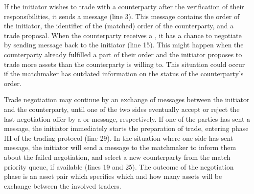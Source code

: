 If the initiator wishes to trade with a counterparty after the verification of their responsibilities, it sends a \MsgTrdProp{} message (line 3).
This message contains the order of the initiator, the identifier of the (matched) order of the counterparty, and a trade proposal.
When the counterparty receives a \MsgTrdProp{}, it has a chance to negotiate by sending \MsgTrdNegotiate{} message back to the initiator (line 15).
This might happen when the counterparty already fulfilled a part of their order and the initiator proposes to trade more assets than the counterparty is willing to.
This situation could occur if the matchmaker has outdated information on the status of the counterparty's order.

Trade negotiation may continue by an exchange of \MsgTrdNegotiate{} messages between the initiator and the counterparty, until one of the two sides eventually accept or reject the last negotiation offer by a \MsgTrdAccept{} or \MsgTrdReject{} message, respectively.
If one of the parties has sent a \MsgTrdAccept{} message, the initiator immediately starts the preparation of trade, entering phase III of the trading protocol (line 29). 
In the situation where one side has sent \MsgTrdReject{} message, the initiator will send a \MsgRejectMatch{} message to the matchmaker to inform them about the failed negotiation, and select a new counterparty from the match priority queue, if available (lines 19 and 25).
The outcome of the negotiation phase is an asset pair which specifies which and how many assets will be exchange between the involved traders.



